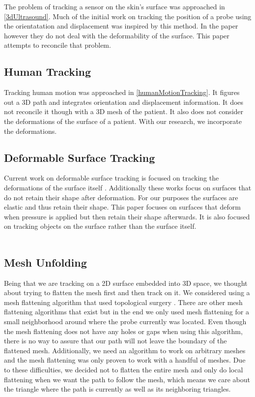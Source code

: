 The problem of tracking a sensor on the skin's surface was approached in \ref{3dUltrasound}. Much of the initial work on tracking the position of a probe using the orientatation and displacement was inspired by this method. In the paper however they do not deal with the deformability of the surface. This paper attempts to reconcile that problem.\\

\subsection{Human Tracking}

Tracking human motion was approached in \ref{humanMotionTracking}. It figures out a 3D path and integrates orientation and displacement information. It does not reconcile it though with a 3D mesh of the patient. It also does not consider the deformations of the surface of a patient. With our research, we incorporate the deformations. 

\subsection{Deformable Surface Tracking}

Current work on deformable surface tracking is focused on tracking the deformations of the surface itself \cite{deformableobjecttracking,convexopt}. Additionally these works focus on surfaces that do not retain their shape after deformation. For our purposes the surfaces are elastic and thus retain their shape. This paper focuses on surfaces that deform when pressure is applied but then retain their shape afterwards. It is also focused on tracking objects on the surface rather than the surface itself.\\
\\

\subsection{Mesh Unfolding}

Being that we are tracking on a 2D surface embedded into 3D space, we thought about trying to flatten the mesh first and then track on it. We considered using a mesh flattening algorithm that used topological surgery \cite{meshunfolding}. There are other mesh flattening algorithms that exist but in the end we only used mesh flattening for a small neighborhood around where the probe currently was located. Even though the mesh flattening does not have any holes or gaps when using this algorithm, there is no way to assure that our path will not leave the boundary of the flattened mesh. Additionally, we need an algorithm to work on arbitrary meshes and the mesh flattening was only proven to work with a handful of meshes. Due to these difficulties, we decided not to flatten the entire mesh and only do local flattening when we want the path to follow the mesh, which means we care about the triangle where the path is currently as well as its neighboring triangles. 